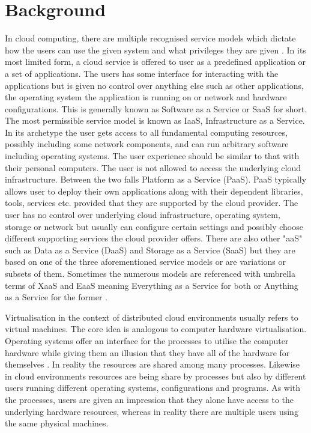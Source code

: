\section{Background}

			In cloud computing, there are multiple recognised service models which dictate how the users can use the given system and what privileges they are given \cite{Mell:2011:SND:2206223}. In its most limited form, a cloud service is offered to user as a predefined application or a set of applications. The users has some interface for interacting with the applications but is given no control over anything else such as other applications, the operating system the application is running on or network and hardware configurations. This is generally known as Software as a Service or SaaS for short. The most permissible service model is known as IaaS, Infrastructure as a Service. In its archetype the user gets access to all fundamental computing resources, possibly including some network components, and can run arbitrary software including operating systems. The user experience should be similar to that with their personal computers. The user is not allowed to access the underlying cloud infrastructure. Between the two falls Platform as a Service (PaaS). PaaS typically allows user to deploy their own applications along with their dependent libraries, tools, services etc. provided that they are supported by the cloud provider. The user has no control over underlying cloud infrastructure, operating system, storage or network but usually can configure certain settings and possibly choose different supporting services the cloud provider offers. There are also other "aaS" such as Data as a Service (DaaS) and Storage as a Service (SaaS) but they are based on one of the three aforementioned service models or are variations or subsets of them. Sometimes the numerous models are referenced with umbrella terms of XaaS and EaaS meaning Everything as a Service for both or Anything as a Service for the former \cite{XaaS}.

Virtualisation in the context of distributed cloud environments usually refers to virtual machines. The core idea is analogous to computer hardware virtualisation. Operating systems offer an interface for the processes to utilise the computer hardware while giving them an illusion that they have all of the hardware for themselves \cite{ArpaciDusseau14-Book}. In reality the resources are shared among many processes. Likewise in cloud environments resources are being share by processes but also by different users running different operating systems, configurations and programs. As with the processes, users are given an impression that they alone have access to the underlying hardware resources, whereas in reality there are multiple users using the same physical machines.


